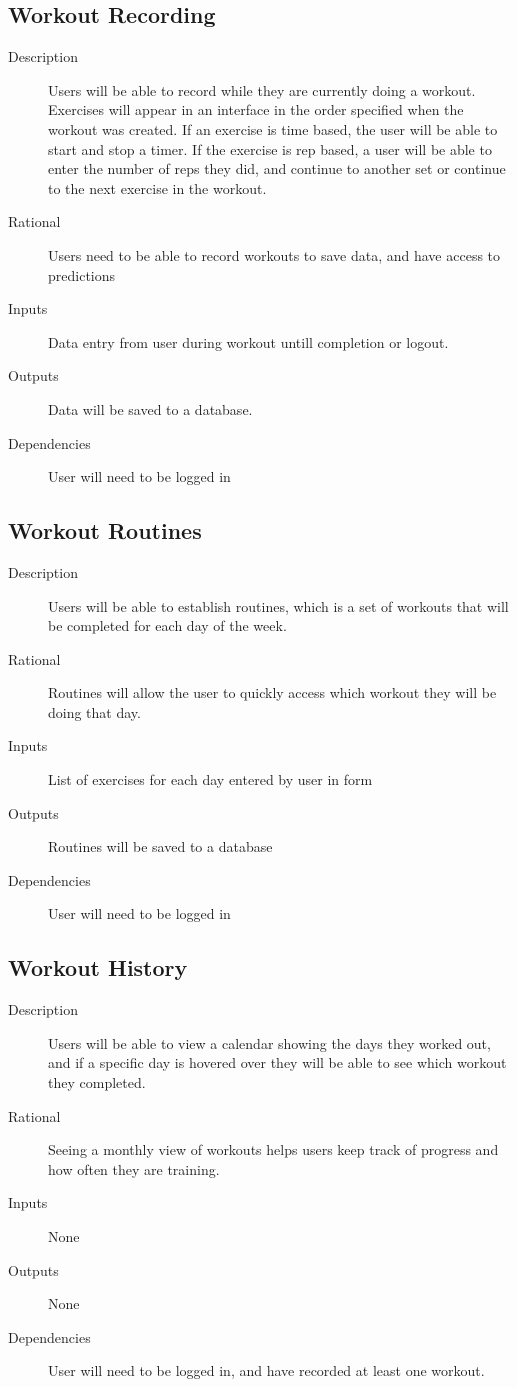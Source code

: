 \documentclass[12pt]{article}
\begin{document}
\subsection{Workout Recording}
\begin{description}
	\item[Description] Users will be able to record while they are currently doing a workout. Exercises will appear in an interface in the order specified when the workout was created. If an exercise is time based, the user will be able to start and stop a timer. If the exercise is rep based, a user will be able to enter the number of reps they did, and continue to another set or continue to the next exercise in the workout.
	\item[Rational] Users need to be able to record workouts to save data, and have access to predictions
	\item[Inputs] Data entry from user during workout untill completion or logout.
	\item[Outputs] Data will be saved to a database.
	\item[Dependencies] User will need to be logged in
\end{description}

\subsection{Workout Routines}
\begin{description}
	\item[Description] Users will be able to establish routines, which is a set of workouts that will be completed for each day of the week.
	\item[Rational] Routines will allow the user to quickly access which workout they will be doing that day.
	\item[Inputs] List of exercises for each day entered by user in form
	\item[Outputs] Routines will be saved to a database
	\item[Dependencies] User will need to be logged in
\end{description}

\subsection{Workout History}
\begin{description}
	\item[Description] Users will be able to view a calendar showing the days they worked out, and if a specific day is hovered over they will be able to see which workout they completed.
	\item[Rational] Seeing a monthly view of workouts helps users keep track of progress and how often they are training.
	\item[Inputs] None
	\item[Outputs] None
	\item[Dependencies] User will need to be logged in, and have recorded at least one workout. 
\end{description}
\end{document}
